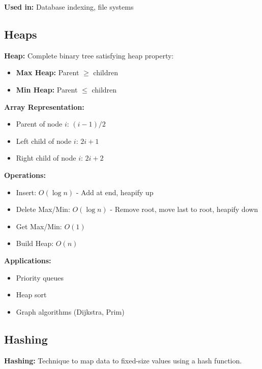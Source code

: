 \documentclass[11pt,a4paper]{article}
\begin{document}
\textbf{Used in:} Database indexing, file systems

\subsection{Heaps}

\begin{defbox}
\textbf{Heap:} Complete binary tree satisfying heap property:
\begin{itemize}
    \item \textbf{Max Heap:} Parent $\geq$ children
    \item \textbf{Min Heap:} Parent $\leq$ children
\end{itemize}
\end{defbox}

\textbf{Array Representation:}
\begin{itemize}
    \item Parent of node $i$: $(i-1)/2$
    \item Left child of node $i$: $2i + 1$
    \item Right child of node $i$: $2i + 2$
\end{itemize}

\textbf{Operations:}
\begin{itemize}
    \item Insert: $O(\log n)$ - Add at end, heapify up
    \item Delete Max/Min: $O(\log n)$ - Remove root, move last to root, heapify down
    \item Get Max/Min: $O(1)$
    \item Build Heap: $O(n)$
\end{itemize}

\textbf{Applications:}
\begin{itemize}
    \item Priority queues
    \item Heap sort
    \item Graph algorithms (Dijkstra, Prim)
\end{itemize}

\subsection{Hashing}

\begin{defbox}
\textbf{Hashing:} Technique to map data to fixed-size values using a hash function.
\end{defbox}
\end{document}
